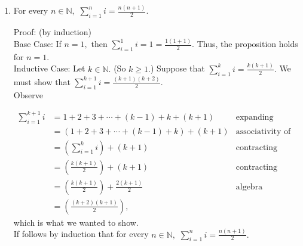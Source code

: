 \documentclass[11pt]{report}
\theoremstyle{plain}
\begin{document}
\begin{enumerate}
\item For every $n \in\mathbb{N},$ $\displaystyle \sum_{i=1}^{n} i = \frac{n(n+1)}{2}.$

Proof: (by induction)\\
Base Case: If $n=1,$ then $\displaystyle \sum_{i=1}^{1} i =1= \frac{1(1+1)}{2}.$ Thus, the proposition holds for $n=1.$\\

Inductive Case: Let $k \in \mathbb{N}.$ (So $k \geq 1.$) Suppose that $\displaystyle \sum_{i=1}^{k} i = \frac{k(k+1)}{2}.$ We must show that $\displaystyle \sum_{i=1}^{k+1} i = \frac{(k+1)(k+2)}{2}.$\\
Observe 

\begin{align*}
\sum_{i=1}^{k+1} i  &= 1+2+3+ \cdots + (k-1)+k+(k+1) &\text{expanding summation notation} \\
 &=(1+2+3+ \cdots + (k-1)+k)+(k+1) &\text{associativity of addition} \\
 &=\left(\sum_{i=1}^{k} i \right)+(k+1) &\text{contracting summation notation} \\
  &=\left(\frac{k(k+1)}{2}\right)+(k+1) &\text{contracting summation notation} \\
  &=\left(\frac{k(k+1)}{2}\right)+\frac{2(k+1)}{2} &\text{algebra} \\
   &=\left(\frac{(k+2)(k+1)}{2}\right),&
  \end{align*}
  which is what we wanted to show.\\
  
  If follows by induction that for every $n \in\mathbb{N},$ $\displaystyle \sum_{i=1}^{n} i = \frac{n(n+1)}{2}.$
\end{enumerate}
\end{document}
